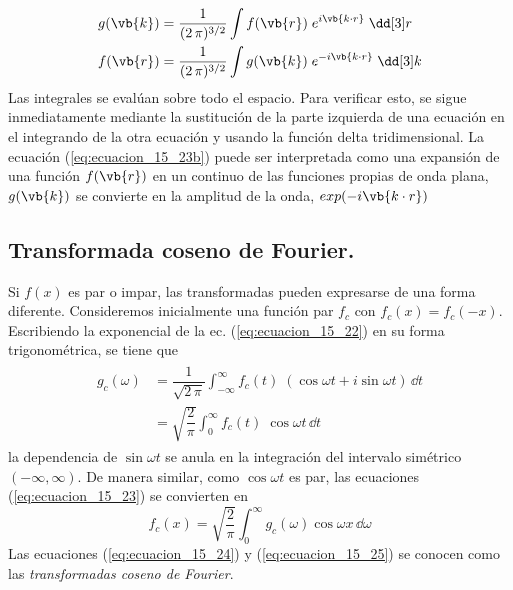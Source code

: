 \begin{subequations}
\begin{align}
g (\vb{k}) &= \dfrac{1}{(2 \, \pi)^{3/2}} \int f (\vb{r}) \; e^{i \vb{k \cdot r}} \; \dd[3] r \label{eq:ecuacion_15_23a} \\
f (\vb{r}) &= \dfrac{1}{(2 \, \pi)^{3/2}} \int g (\vb{k}) \; e^{-i \vb{k \cdot r}} \; \dd[3] k \label{eq:ecuacion_15_23b}
\end{align}
\end{subequations}
Las integrales se evalúan sobre todo el espacio. Para verificar esto, se sigue inmediatamente mediante la sustitución de la parte izquierda de una ecuación en el integrando de la otra ecuación y usando la función delta tridimensional. La ecuación (\ref{eq:ecuacion_15_23b}) puede ser interpretada como una expansión de una función $f(\vb{r})$ en un continuo de las funciones propias de onda plana, $g(\vb{k})$ se convierte en la amplitud de la onda, $exp(-i \vb{k \cdot r})$
\subsection{Transformada coseno de Fourier.}
Si $f(x)$ es par o impar, las transformadas pueden expresarse de una forma diferente. Consideremos inicialmente una función par $f_{c}$ con $f_{c}(x) = f_{c}(-x)$. Escribiendo la exponencial de la ec. (\ref{eq:ecuacion_15_22}) en su forma trigonométrica, se tiene que
\begin{align}
\begin{aligned}
g_{c}(\omega) &= \dfrac{1}{\sqrt{2 \, \pi}} \int_{-\infty}^{\infty} f_{c} (t) \; (\cos \omega t + i \sin \omega t) \, \dd{t} \\
&= \sqrt{\dfrac{2}{\pi}} \int_{0}^{\infty} f_{c} (t) \; \cos \omega t \, \dd{t} 
\label{eq:ecuacion_15_24}
\end{aligned}
\end{align}
la dependencia de $\sin \omega t$ se anula en la integración del intervalo simétrico $(-\infty, \infty)$. De manera similar, como $\cos \omega t$ es par, las ecuaciones (\ref{eq:ecuacion_15_23}) se convierten en
\begin{equation}
f_{c} (x) = \sqrt{\dfrac{2}{\pi}} \int_{0}^{\infty} g_{c} (\omega) \cos \omega x \, \dd{\omega} 
\label{eq:ecuacion_15_25}
\end{equation}
Las ecuaciones (\ref{eq:ecuacion_15_24}) y (\ref{eq:ecuacion_15_25}) se conocen como las \emph{transformadas coseno de Fourier}.
